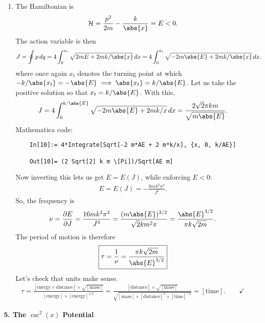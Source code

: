 \documentclass{article}
\theoremstyle{definition}
\newcommand{\p}{\partial}
\newcommand{\ham}{\mathcal{H}}
\newcommand{\f}[2]{\frac{#1}{#2}}
\begin{document}
\begin{enumerate}[label=(\alph*)]
	\item The Hamiltonian is 
	\begin{align*}
	\ham = \f{p^2}{2m} - \f{k}{\abs{x}} = E < 0. 
	\end{align*}
	The action variable is then 
	\begin{align*}
	J = \oint p\,dq = 4\int_0^{x_t} \sqrt{2mE + 2mk/\abs{x}}\,dx =  4\int_0^{x_t} \sqrt{-2m\abs{E} + 2mk/\abs{x}}\,dx.
	\end{align*}
	where once again $x_t$ denotes the turning point at which $-k/\abs{x_t} = -\abs{E} \implies \abs{x_t} =k/\abs{E}$. Let us take the positive solution so that $x_t = k/\abs{E}$. With this,
	\begin{align*}
	J = 4\int_0^{k/\abs{E}} \sqrt{-2m\abs{E} + 2mk/{x}}\,dx =  \f{2\sqrt{2} \pi km}{\sqrt{m\abs{E}}}.
	\end{align*}
	Mathematica code:
	\begin{lstlisting}
	In[10]:= 4*Integrate[Sqrt[-2 m*AE + 2 m*k/x], {x, 0, k/AE}]
	
	Out[10]= (2 Sqrt[2] k m \[Pi])/Sqrt[AE m]
	\end{lstlisting}
	Now inverting this lets us get ${E} = {E(J)}$, while enforcing $E<0$:
	\begin{align*}
	{E} = {E(J)} = -\f{8m k^2 \pi^2}{J^2}.
	\end{align*}
	So, the frequency is 
	\begin{align*}
	\nu = \f{\p {E}}{\p J} = \f{16 m k^2 \pi^2}{J^3} = \f{(m\abs{E})^{3/2}}{\sqrt{2} km^2 \pi} = \f{\abs{E}^{3/2}}{\pi k\sqrt{2m}}.
	\end{align*}
	The period of motion is therefore
	\begin{align*}
	\boxed{\tau = \f{1}{\nu} = \f{\pi k \sqrt{2m}}{\abs{E}^{3/2}}}
	\end{align*}
	Let's check that units make sense.
	\begin{align*}
	\tau = \f{[\text{energy}\times\text{distance}]\times \sqrt{[\text{mass}]}}{[\text{energy}]\times[\text{energy}]^{1/2}} = \f{[\text{distance}]\times \sqrt{[\text{mass}]}}{\sqrt{[\text{mass}]\times [\text{distance}]^2 \times [\text{time}]^{-2}}} = [\text{time}].\quad\quad\checkmark
	\end{align*}
	
	
	
	
	
\end{enumerate}



\noindent \textbf{5. The $\csc^2(x)$ Potential}
\end{document}
